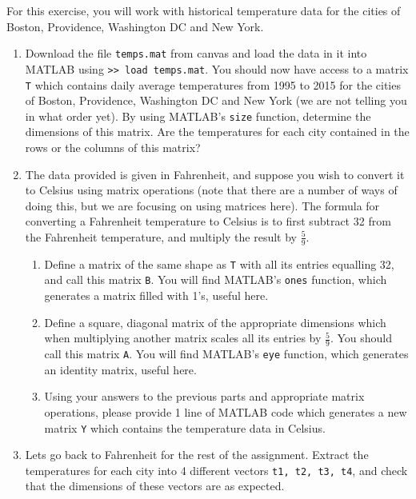 \begin{prob}
For this exercise, you will work with historical temperature data for the cities of Boston, Providence, Washington DC and New York.
\begin{enumerate}
\item Download the file \texttt{temps.mat} from canvas and load the data in it into MATLAB using \texttt{>> load temps.mat}. You should now have access to a matrix \texttt{T} which contains daily average temperatures from 1995 to 2015 for the cities of Boston, Providence, Washington DC and New York (we are not telling you in what order yet). By using MATLAB's \texttt{size} function, determine the dimensions of this matrix. Are the temperatures for each city contained in the rows or the columns of this matrix?
\item The data provided is given in Fahrenheit, and suppose you wish to convert it to Celsius using matrix operations (note that there are a number of ways of doing this, but we are focusing on using matrices here). The formula for converting a Fahrenheit temperature to Celsius is to first subtract 32 from the Fahrenheit temperature, and multiply the result by $\frac59$.

    \begin{enumerate}
    \item Define a matrix of the same shape as \texttt{T} with all its entries equalling 32, and call this matrix \texttt{B}. You will find MATLAB's \texttt{ones} function, which generates a matrix filled with 1's, useful here.
    
    \item Define a square, diagonal matrix of the appropriate dimensions which when multiplying another matrix scales all its entries by $\frac59$.  You should call this matrix \texttt{A}. You will find MATLAB's \texttt{eye} function, which generates an identity matrix, useful here.
    
    \item Using your answers to the previous parts and appropriate matrix operations, please provide 1 line of MATLAB code which generates a new matrix \texttt{Y} which contains the temperature data in Celsius.
    \end{enumerate}

\item Lets go back to Fahrenheit for the rest of the assignment. Extract the temperatures for each city into 4 different vectors \texttt{t1, t2, t3, t4}, and check that the dimensions of these vectors are as expected.


\end{enumerate}
\end{prob}
